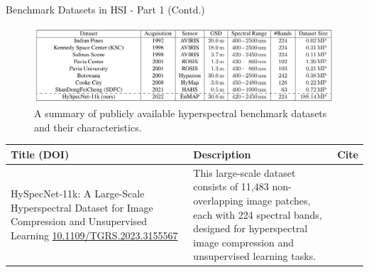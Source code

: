 \documentclass[10pt,svgnames,fragile]{beamer}
\begin{document}
\begin{frame}{Benchmark Datasets in HSI - Part 1 (Contd.)}
\small
\begin{figure}
    \centering
    \includegraphics[width=1\linewidth]{HySpecNet_table.png}
    \caption{A summary of publicly available hyperspectral benchmark datasets and their characteristics.\cite{fuchsHySpecNet11kLargeScaleHyperspectral2023}}
    \label{fig:HySpecNet-example}
\end{figure}
\vspace{-0.8cm} %
\begin{table}[]
    \centering
    \begin{tabular}{|p{4.5cm}|p{6cm}|p{0.5cm}|}
        \hline
        \textbf{Title (DOI)} & \textbf{Description} & \textbf{Cite} \\ \hline
        HySpecNet-11k: A Large-Scale Hyperspectral Dataset for Image Compression and Unsupervised Learning \newline \href{https://consensus.app/papers/hyspecnet11k-largescale-hyperspectral-dataset-fuchs/86b52e4fcd0c50f6b4c0da950c6e4c11/?utm_source=chatgpt}{\color{blue}10.1109/TGRS.2023.3155567} & This large-scale dataset consists of 11,483 non-overlapping image patches, each with 224 spectral bands, designed for hyperspectral image compression and unsupervised learning tasks. & \cite{fuchsHySpecNet11kLargeScaleHyperspectral2023} \\ \hline
    \end{tabular}
\end{table}
\end{frame}
\end{document}

